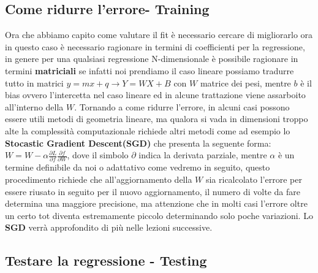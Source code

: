 \documentclass[11pt]{article}
\begin{document}
\hypertarget{come-ridurre-lerrore--training}{%
\subsection{Come ridurre l'errore-
Training}\label{come-ridurre-lerrore--training}}

Ora che abbiamo capito come valutare il fit è necessario cercare di
migliorarlo ora in questo caso è necessario ragionare in termini di
coefficienti per la regressione, in genere per una qualsiasi regressione
N-dimensionale è possibile ragionare in termini \textbf{matriciali} se
infatti noi prendiamo il caso lineare possiamo tradurre tutto in matrici
\(y = mx +q \rightarrow Y = WX+B\) con \(W\) matrice dei pesi, mentre
\(b\) è il bias ovvero l'intercetta nel caso lineare ed in alcune
trattazione viene assarboito all'interno della \(W\). Tornando a come
ridurre l'errore, in alcuni casi possono essere utili metodi di
geometria lineare, ma qualora si vada in dimensioni troppo alte la
complessità computazionale richiede altri metodi come ad esempio lo
\textbf{Stocastic Gradient Descent(SGD)} che presenta la seguente forma:
\(W = W - \alpha \frac{\partial L}{\partial f}\frac{\partial f}{\partial W}\),
dove il simbolo \(\partial\) indica la derivata parziale, mentre
\(\alpha\) è un termine definibile da noi o adattativo come vedremo in
seguito, questo procedimento richiede che all'aggiornamento della \(W\)
sia ricalcolato l'errore per essere riusato in seguito per il nuovo
aggiornamento, il numero di volte da fare determina una maggiore
precisione, ma attenzione che in molti casi l'errore oltre un certo tot
diventa estremamente piccolo determinando solo poche variazioni. Lo
\textbf{SGD} verrà approfondito di più nelle lezioni successive.

\hypertarget{testare-la-regressione---testing}{%
\subsection{Testare la regressione -
Testing}\label{testare-la-regressione---testing}}
\end{document}
